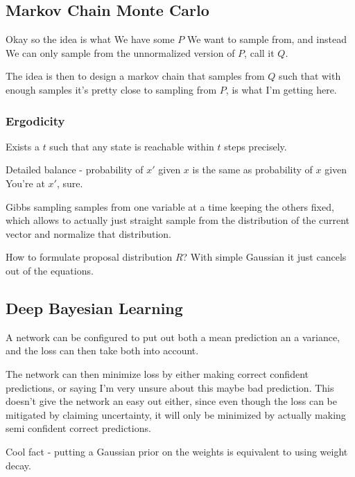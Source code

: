 \documentclass{article}
\begin{document}
	\subsection{Markov Chain Monte Carlo}
	
		Okay so the idea is what We have some $P$ We want to sample from, and instead We can only sample from the unnormalized version of $P$, call it $Q$.
		
		The idea is then to design a markov chain that samples from $Q$ such that with enough samples it's pretty close to sampling from $P$, is what I'm getting here.
		
		\subsubsection{Ergodicity}
		
			Exists a $t$ such that any state is reachable within $t$ steps precisely.
			
			Detailed balance - probability of $x'$ given $x$ is the same as probability of $x$ given You're at $x'$, sure.
			
			Gibbs sampling samples from one variable at a time keeping the others fixed, which allows to actually just straight sample from the distribution of the current vector and normalize that distribution.
			
			How to formulate proposal distribution $R$? With simple Gaussian it just cancels out of the equations.
			
				
			
			
			
			
			
	
	\subsection{Deep Bayesian Learning}
	
		A network can be configured to put out both a mean prediction an a variance, and the loss can then take both into account. 
		
		The network can then minimize loss by either making correct confident predictions, or saying I'm very unsure about this maybe bad prediction. This doesn't give the network an easy out either, since even though the loss can be mitigated by claiming uncertainty, it will only be minimized by actually making semi confident correct predictions.
		
		Cool fact - putting a Gaussian prior on the weights is equivalent to using weight decay.
		
\end{document}
